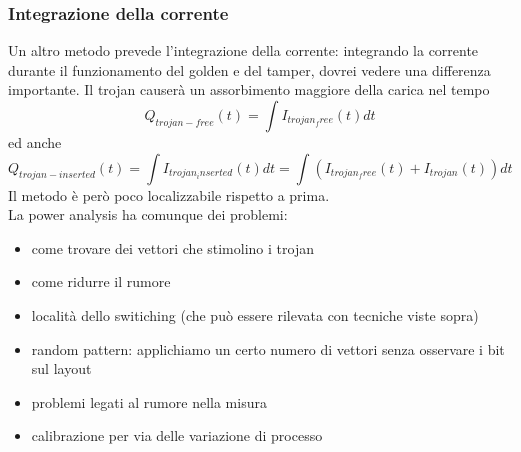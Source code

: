 \documentclass[oneside, 12pt]{extbook}
\begin{document}
\subsubsection{Integrazione della corrente}
Un altro metodo prevede l'integrazione della corrente: integrando la corrente durante il funzionamento del golden e del tamper, dovrei vedere una differenza importante. Il trojan causerà un assorbimento maggiore della carica nel tempo
\begin{equation}
	Q_{trojan-free}(t) = \int I_{trojan_free}(t) dt
\end{equation}
ed anche
\begin{equation}
	Q_{trojan-inserted}(t) = \int I_{trojan_inserted}(t) dt = \int (I_{trojan_free}(t) + I_{trojan}(t)) dt
\end{equation}
Il metodo è però poco localizzabile rispetto a prima.
\\La power analysis ha comunque dei problemi:
\begin{itemize}
	\item come trovare dei vettori che stimolino i trojan
	\item come ridurre il rumore
	\item località dello switiching (che può essere rilevata con tecniche viste sopra)
	\item random pattern: applichiamo un certo numero di vettori senza osservare i bit sul layout
	\item problemi legati al rumore nella misura
	\item calibrazione per via delle variazione di processo
\end{itemize}
\end{document}
